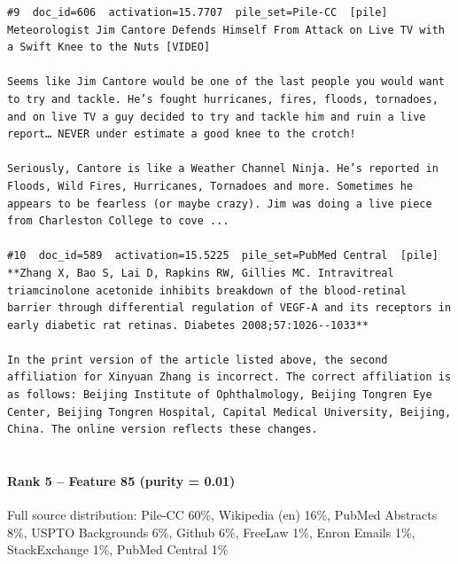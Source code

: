 \begin{verbatim}
#9  doc_id=606  activation=15.7707  pile_set=Pile-CC  [pile]
Meteorologist Jim Cantore Defends Himself From Attack on Live TV with a Swift Knee to the Nuts [VIDEO]

Seems like Jim Cantore would be one of the last people you would want to try and tackle. He’s fought hurricanes, fires, floods, tornadoes, and on live TV a guy decided to try and tackle him and ruin a live report… NEVER under estimate a good knee to the crotch!

Seriously, Cantore is like a Weather Channel Ninja. He’s reported in Floods, Wild Fires, Hurricanes, Tornadoes and more. Sometimes he appears to be fearless (or maybe crazy). Jim was doing a live piece from Charleston College to cove ...

#10  doc_id=589  activation=15.5225  pile_set=PubMed Central  [pile]
**Zhang X, Bao S, Lai D, Rapkins RW, Gillies MC. Intravitreal triamcinolone acetonide inhibits breakdown of the blood-retinal barrier through differential regulation of VEGF-A and its receptors in early diabetic rat retinas. Diabetes 2008;57:1026--1033**

In the print version of the article listed above, the second affiliation for Xinyuan Zhang is incorrect. The correct affiliation is as follows: Beijing Institute of Ophthalmology, Beijing Tongren Eye Center, Beijing Tongren Hospital, Capital Medical University, Beijing, China. The online version reflects these changes.


\end{verbatim}

\paragraph*{Rank 5 -- Feature 85 (purity = 0.01)}

Full source distribution: Pile-CC 60\%, Wikipedia (en) 16\%, PubMed Abstracts 8\%, USPTO Backgrounds 6\%, Github 6\%, FreeLaw 1\%, Enron Emails 1\%, StackExchange 1\%, PubMed Central 1\%

